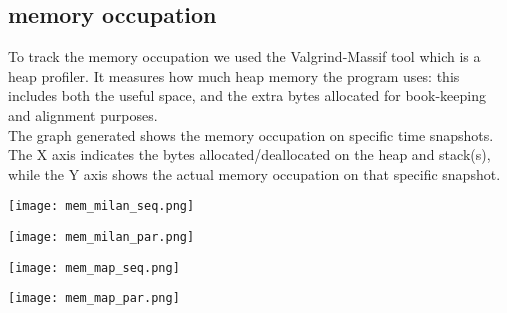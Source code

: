 \subsection{memory occupation}

To track the memory occupation we used the Valgrind-Massif tool which is a heap profiler. It measures how much heap memory the program uses: this includes both the useful space,
and the extra bytes allocated for book-keeping and alignment purposes.
\\
The graph generated shows the memory occupation on specific time snapshots. The X axis indicates the bytes allocated/deallocated on the heap and stack(s), while the Y axis shows the actual memory occupation on that specific snapshot.

\vspace{0.5cm}

\begin{center}
    \begin{minipage}[b]{0.45\textwidth}
        \texttt{[image: mem\_milan\_seq.png]}
        \label{mem-seq-milan}
    \end{minipage}
    \hspace{0.5cm}
    \begin{minipage}[b]{0.45\textwidth}
        \texttt{[image: mem\_milan\_par.png]}
        \label{mem-par-milan}
    \end{minipage}%
    
    \vspace{0.5cm}
    
    \begin{minipage}[b]{0.45\textwidth}
        \texttt{[image: mem\_map\_seq.png]}
        \label{mem-seq-map}
    \end{minipage}%
    \hspace{0.5cm}
    \begin{minipage}[b]{0.45\textwidth}
        \texttt{[image: mem\_map\_par.png]}
        \label{mem-par-map}
    \end{minipage}

\end{center}

\vspace{0.5cm}

